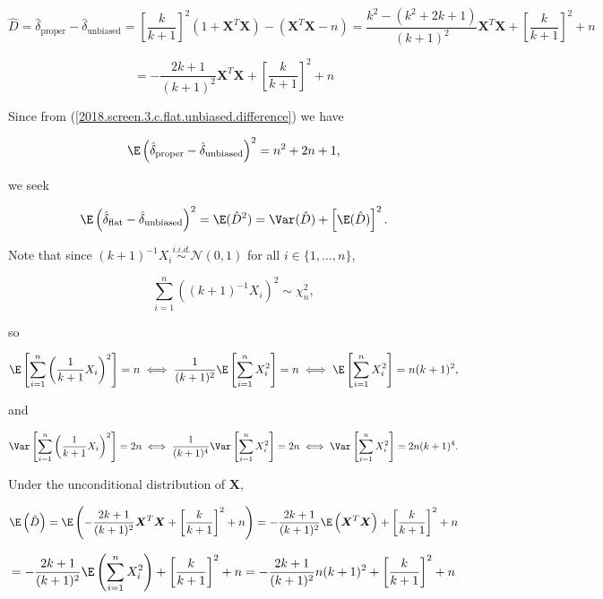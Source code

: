 \begin{solution}
\begin{enumerate}[(a)]
\[
\hat{D} = \hat{\delta}_{\text{proper}}  - \hat{\delta}_{\text{unbiased}} =  \left[ \frac{k}{k+1} \right]^2 \left(1   +     \boldsymbol{X}^T \boldsymbol{X} \right) - \left( \boldsymbol{X}^T\boldsymbol{X} - n \right) = \frac{k^2 - (k^2 + 2k + 1)}{(k+1)^2}  \boldsymbol{X}^T\boldsymbol{X} + \left[ \frac{k}{k+1} \right]^2 + n
\]

\begin{equation}
= -\frac{2k + 1}{(k+1)^2}  \boldsymbol{X}^T\boldsymbol{X} + \left[ \frac{k}{k+1} \right]^2 + n
\end{equation}



Since from  (\ref{2018.screen.3.c.flat.unbiased.difference}) we have

\[
\E \left( \hat{\delta}_{\text{proper}}  - \hat{\delta}_{\text{unbiased}} \right)^2 = n^2 + 2n + 1,
\]

we seek

\[
\E \left( \hat{\delta}_{\text{flat}}  - \hat{\delta}_{\text{unbiased}} \right)^2= \E( \hat{D}^2) = \Var(\hat{D}) + \left[\E(\hat{D}) \right]^2.
\]

Note that since \((k+1)^{-1} X_i \overset{i.i.d.}{\sim} \mathcal{N}(0,1)\) for all \(i \in \{1, \ldots, n\}\), 

\[
\sum_{i=1}^n \left( (k+1)^{-1} X_i \right)^2 \sim \chi_n^2,
\]

so

\[
\E \left[ \sum_{i=1}^n \left( \frac{1}{k+1} X_i \right)^2  \right] = n \iff \frac{1}{(k+1)^2} \E \left[ \sum_{i=1}^n X_i ^2  \right] = n \iff  \E \left[ \sum_{i=1}^n X_i ^2  \right] = n(k+1)^2,
\]

and

\[
\Var \left[ \sum_{i=1}^n \left( \frac{1}{k+1} X_i \right)^2  \right] = 2n \iff \frac{1}{(k+1)^4} \Var \left[ \sum_{i=1}^n X_i ^2  \right] = 2n \iff  \Var \left[ \sum_{i=1}^n X_i ^2  \right] = 2n(k+1)^4.
\]

Under the unconditional distribution of \(\boldsymbol{X}\),

\[
\E \left(\hat{D} \right) = \E \left( -\frac{2k + 1}{(k+1)^2}  \boldsymbol{X}^T\boldsymbol{X} + \left[ \frac{k}{k+1} \right]^2 + n \right)  =  - \frac{2k +1}{(k+1)^2}\E \left(  \boldsymbol{X}^T\boldsymbol{X}  \right) + \left[ \frac{k}{k+1} \right]^2 + n
\]

\[
=  - \frac{2k +1}{(k+1)^2}\E \left(  \sum_{i=1}^n X_i^2  \right) + \left[ \frac{k}{k+1} \right]^2 + n =  - \frac{2k +1}{(k+1)^2} n(k+1)^2 + \left[ \frac{k}{k+1} \right]^2 + n
\]


\end{enumerate}
\end{solution}
